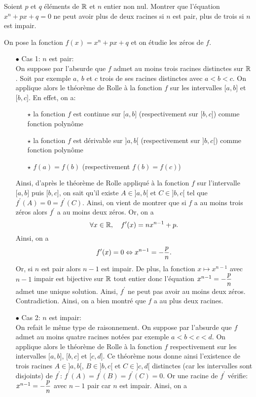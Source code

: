 \documentclass[a4paper, 11pt,reqno]{article}
\begin{document}
\begin{exercice}  \;
	Soient $p$ et $q$ \'el\'ements de $\mathbb{R}$ et $n$ entier non nul. Montrer que l'\'equation $x^n+px+q=0$ ne peut avoir plus de deux racines si $n$ est pair, plus de trois si $n$ est impair.
\end{exercice}
\begin{correction}  \;
	On pose la fonction $f(x)=x^n+px+q$ et on \'etudie les z\'eros de $f$.
	\begin{itemize}
		\item[$\bullet$] Cas 1: $n$ est pair:\\
		      \noindent  On suppose par l'absurde que $f$ admet au moins trois racines distinctes sur $\mathbb{R}$. Soit par exemple $a,\ b$ et $c$ trois de ses racines distinctes avec $a<b<c$. On applique alors le th\'eor\`eme de Rolle \`a la fonction $f$ sur les intervalles $\lbrack a,b\rbrack$ et $\lbrack b,c\rbrack$. En effet, on a:
		      \begin{itemize}
			      \item[$\star$] la fonction $f$ est continue sur $\lbrack a,b\rbrack$ (respectivement sur $\lbrack b,c\rbrack$) comme fonction polyn\^ome
			      \item[$\star$] la fonction $f$ est d\'erivable sur $\rbrack a,b\lbrack$ (respectivement sur $\rbrack b,c\lbrack$) comme fonction polyn\^ome
			      \item[$\star$]  $f(a)=f(b)$ (respectivement $f(b)=f(c)$)
		      \end{itemize}
		      Ainsi, d'apr\`es le th\'eor\`eme de Rolle appliqu\'e \`a la fonction $f$ sur l'intervalle $\lbrack a,b\rbrack$ puis $\lbrack b,c\rbrack$, on sait qu'il existe $A\in\rbrack a,b\lbrack$ et $C\in\rbrack b,c\lbrack$ tel que $f^{\prime}(A)=0=f^{\prime}(C)$. Ainsi, on vient de montrer que si $f$ a au moins trois z\'eros alors $f^{\prime}$ a au moins deux z\'eros. Or, on a
		      $$\forall x\in\mathbb{R},\quad f^{\prime}(x)=nx^{n-1}+p.$$
		      Ainsi, on a
		      $$f^{\prime}(x)=0\Leftrightarrow x^{n-1}=-\displaystyle\frac{p}{n}.$$
		      Or, si $n$ est pair alors $n-1$ est impair. De plus, la fonction $x\mapsto x^{n-1}$ avec $n-1$ impair est bijective sur $\mathbb{R}$ tout entier donc l'\'equation $x^{n-1}=-\displaystyle\frac{p}{n}$ admet une unique solution. Ainsi, $f^{\prime}$ ne peut pas avoir au moins deux z\'eros. Contradiction. Ainsi, on a bien montr\'e que $f$ a au plus deux racines.
		\item[$\bullet$]  Cas 2: $n$ est impair:\\
		      \noindent On refait le m\^eme type de raisonnement. On suppose par l'absurde que $f$ admet au moins quatre racines not\'ees par exemple $a<b<c<d$. On applique alors le th\'eor\`eme de Rolle \`a la fonction $f$ respectivement sur les intervalles $\lbrack a,b\rbrack$, $\lbrack b,c\rbrack$ et $\lbrack c,d\rbrack$. Ce th\'eor\`eme nous donne ainsi l'existence de trois racines $A\in\rbrack a,b\lbrack$, $B\in\rbrack b,c\lbrack$ et $C\in\rbrack c,d\lbrack$ distinctes (car les intervalles sont disjoints) de $f^{\prime}$: $f^{\prime}(A)=f^{\prime}(B)=f^{\prime}(C)=0$. Or une racine de $f^{\prime}$ v\'erifie: $x^{n-1}=-\displaystyle\frac{p}{n}$ avec $n-1$ pair car $n$ est impair. Ainsi, on a

\end{itemize}
\end{correction}
\end{document}
